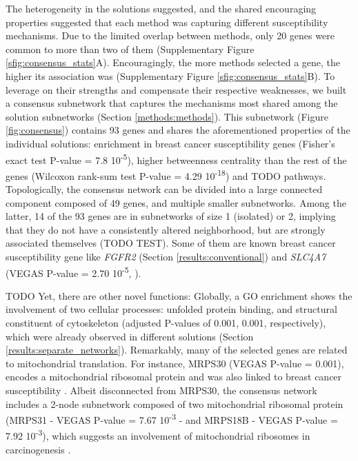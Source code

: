\documentclass[twocolumn, 10pt]{article}
\begin{document}
The heterogeneity in the solutions suggested, and the shared encouraging properties suggested that each method was capturing different susceptibility mechanisms. Due to the limited overlap between methods, only 20 genes were common to more than two of them (Supplementary Figure \ref{sfig:consensus_stats}A). Encouragingly, the more methods selected a gene, the higher its association was (Supplementary Figure \ref{sfig:consensus_stats}B). To leverage on their strengths and compensate their respective weaknesses, we built a consensus subnetwork that captures the mechanisms most shared among the solution subnetworks (Section \ref{methods:methods}). This subnetwork (Figure \ref{fig:consensus}) contains 93 genes and shares the aforementioned properties of the individual solutions: enrichment in breast cancer susceptibility genes (Fisher's exact test P-value = 7.8 \texttimes{} 10\textsuperscript{-5}), higher betweenness centrality than the rest of the genes (Wilcoxon rank-sum test P-value = 4.29 \texttimes{} 10\textsuperscript{-18}) and TODO pathways. Topologically, the consensus network can be divided into a large connected component composed of 49 genes, and multiple smaller subnetworks. Among the latter, 14 of the 93 genes are in subnetworks of size 1 (isolated) or 2, implying that they do not have a consistently altered neighborhood, but are strongly associated themselves (TODO TEST). Some of them are known breast cancer susceptibility gene like \emph{FGFR2} (Section \ref{results:conventional}) and \emph{SLC4A7} (VEGAS P-value = 2.70 \texttimes{} 10\textsuperscript{-5}, \citet{ahmed_newly_2009}).

TODO Yet, there are other novel functions: Globally, a GO enrichment shows the involvement of two cellular processes: unfolded protein binding, and structural constituent of cytoskeleton (adjusted P-values of 0.001, 0.001, respectively), which were already observed in different solutions (Section \ref{results:separate_networks}). Remarkably, many of the selected genes are related to mitochondrial translation. For instance, MRPS30 (VEGAS P-value = 0.001), encodes a mitochondrial ribosomal protein and was also linked to breast cancer susceptibility \cite{quigley_5p12_2014}. Albeit disconnected from MRPS30, the consensus network includes a 2-node subnetwork composed of two mitochondrial ribosomal protein (MRPS31 - VEGAS P-value = 7.67 \texttimes{} 10\textsuperscript{-3} - and MRPS18B - VEGAS P-value = 7.92 \texttimes{} 10\textsuperscript{-3}), which suggests an involvement of mitochondrial ribosomes in carcinogenesis \cite{required}.
\end{document}

